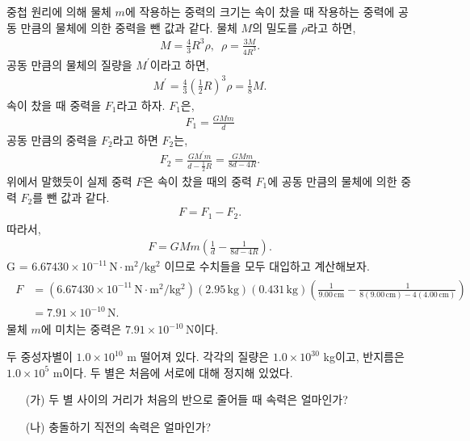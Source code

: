\documentclass[floatfix,nofootinbib,superscriptaddress,fleqn]{revtex4-2}
\begin{document}
중첩 원리에 의해 물체 $m$에 작용하는 중력의 크기는 속이 찼을 때 
작용하는 중력에 공동 만큼의 물체에 의한 중력을 뺀 값과 같다.
물체 $M$의 밀도를 $\rho$라고 하면,
\begin{align}
    M = \frac{4}{3}R^3\rho ,\,\,\,\rho = \frac{3M}{4R^3}.
\end{align}
공동 만큼의 물체의 질량을 $M^\prime$이라고 하면,
\begin{align}
    M^\prime = \frac{4}{3}{\left(\frac{1}{2}R\right)}^3\rho=\frac{1}{8}M.
\end{align}
속이 찼을 때 중력을 $F_1$라고 하자. $F_1$은,
\begin{align}
    F_1 = \frac{GMm}{d}
\end{align}
공동 만큼의 중력을 $F_2$라고 하면 $F_2$는,
\begin{align}
    F_2 = \frac{GM^\prime m}{d-\frac{1}{2}R}=\frac{GMm}
    {8d-4R}.
\end{align}
위에서 말했듯이 실제 중력 $F$은 속이 찼을 때의 중력 $F_1$에 공동 만큼의 물체에 의한 중력 $F_2$를
뺀 값과 같다.
\begin{align}
    F= F_1 - F_2.
\end{align}
따라서,
\begin{align}
    F = GMm\left(\frac{1}{d}-\frac{1}{8d-4R}\right).
\end{align}
 G = $6.67430\times 10^{-11}\,\mathrm{N\cdot m^2/kg^2}$ 이므로 수치들을 모두 대입하고 계산해보자.
\begin{align}
    \begin{split}
        F &= \left(6.67430\times 10^{-11}\,\mathrm{N\cdot m^2/kg^2}\right)
        (2.95\,\mathrm{kg})(0.431\,\mathrm{kg})
        \left(\frac{1}{9.00\,\mathrm{cm}}
        -\frac{1}{8(9.00\,\mathrm{cm})-4(4.00\,\mathrm{cm})}\right) \\
        &=  7.91\times 10^{-10}\,\mathrm{N}.  
    \end{split}
\end{align}
물체 $m$에 미치는 중력은 $7.91\times 10^{-10}\,\mathrm{N}$이다.

\vspace{1.cm}

두 중성자별이 $1.0\times 10^{10}$ m 떨어져 있다. 각각의 질량은
$1.0\times 10^{30} $ kg이고, 반지름은 $1.0\times 10^5$ m이다. 두 별은
처음에 서로에 대해 정지해 있었다.
\begin{itemize}
\item[(가)] 두 별 사이의 거리가 처음의 반으로 줄어들 때 속력은
  얼마인가?
\item[(나)] 충돌하기 직전의 속력은 얼마인가?  
\end{itemize}
\end{document}

